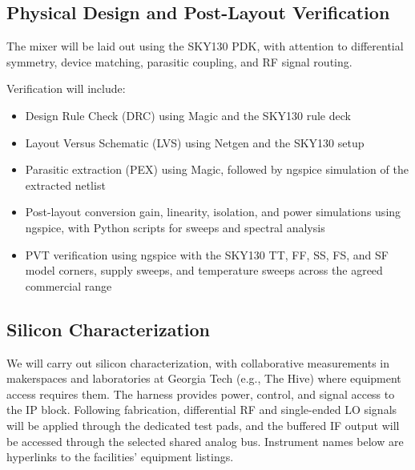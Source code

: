 \subsection{Physical Design and Post-Layout Verification}

The mixer will be laid out using the SKY130 PDK, with attention to differential symmetry, device matching, parasitic coupling, and RF signal routing.

Verification will include:

\begin{itemize}
    \item Design Rule Check (DRC) using Magic and the SKY130 rule deck

    \item Layout Versus Schematic (LVS) using Netgen and the SKY130 setup

    \item Parasitic extraction (PEX) using Magic, followed by ngspice simulation of the extracted netlist

    \item Post-layout conversion gain, linearity, isolation, and power simulations using ngspice, with Python scripts for sweeps and spectral analysis

    \item PVT verification using ngspice with the SKY130 TT, FF, SS, FS, and SF model corners, supply sweeps, and temperature sweeps across the agreed commercial range
\end{itemize}


\subsection{Silicon Characterization}

We will carry out silicon characterization, with collaborative measurements in makerspaces and laboratories at Georgia Tech (e.g., The Hive) where equipment access requires them.
The harness provides power, control, and signal access to the IP block.
Following fabrication, differential RF and single-ended LO signals will be applied through the dedicated test pads, and the buffered IF output will be accessed through the selected shared analog bus.
Instrument names below are hyperlinks to the facilities' equipment listings.

